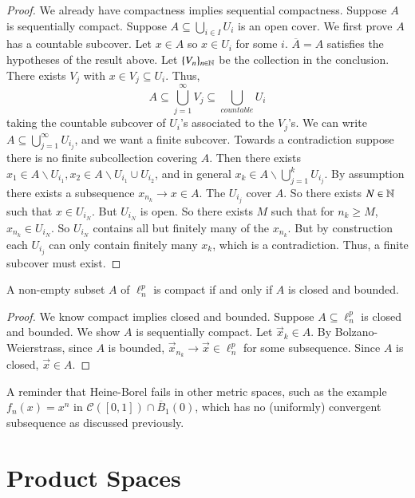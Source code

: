 \begin{proof}
    We already have compactness implies sequential compactness. Suppose $A$ is sequentially compact. Suppose $A \subseteq \bigcup_{i\in I}U_i$ is an open cover. We first prove $A$ has a countable subcover. Let $x \in A$ so $x \in U_i$ for some $i$. $\overline{A} = A$ satisfies the hypotheses of the result above. Let $\{V_n\}_{n \in \mathbb N}$ be the collection in the conclusion. There exists $V_j$ with $x \in V_j \subseteq U_i$. Thus, $$A \subseteq \bigcup_{j=1}^{\infty}V_j \subseteq \bigcup_{countable}U_i$$ taking the countable subcover of $U_i$'s associated to the $V_j$'s. We can write $A \subseteq \bigcup_{j=1}^{\infty}U_{i_j}$, and we want a finite subcover. Towards a contradiction suppose there is no finite subcollection covering $A$. Then there exists $x_1 \in A\backslash U_{i_1}, x_2 \in A\backslash U_{i_1}\cup U_{i_2}$, and in general $x_k \in A \backslash \bigcup_{j=1}^kU_{i_j}$. By assumption there exists a subsequence $x_{n_k}\rightarrow x \in A$. The $U_{i_j}$ cover $A$. So there exists $N \in \mathbb N$ such that $x \in U_{i_N}$. But $U_{i_N}$ is open. So there exists $M$ such that for $n_k \geq M$, $x_{n_k} \in U_{i_N}$. So $U_{i_N}$ contains all but finitely many of the $x_{n_k}$. But by construction each $U_{i_j}$ can only contain finitely many $x_k$, which is a contradiction. Thus, a finite subcover must exist.
\end{proof}

\begin{theorem}
    A non-empty subset $A$ of $\ell_n^p$ is compact if and only if $A$ is closed and bounded.
\end{theorem}
\begin{proof}
    We know compact implies closed and bounded. Suppose $A \subseteq \ell_n^p$ is closed and bounded. We show $A$ is sequentially compact. Let $\vec{x}_k \in A$. By Bolzano-Weierstrass, since $A$ is bounded, $\vec{x}_{n_k} \rightarrow \vec{x} \in \ell_n^p$ for some subsequence. Since $A$ is closed, $\vec{x} \in A$.
\end{proof}

A reminder that Heine-Borel fails in other metric spaces, such as the example $f_n(x) = x^n$ in $\mathcal{C}([0,1])\cap \overline{B}_1(0)$, which has no (uniformly) convergent subsequence as discussed previously.



\section{Product Spaces}


